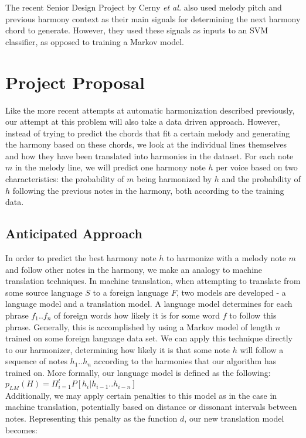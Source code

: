 \documentclass{sig-alternate}
\begin{document}
The recent Senior Design Project by Cerny \textit{et al.} \cite{UAMP} also used melody pitch and previous harmony context
as their main signals for determining the next harmony chord to generate. However, they used these
signals as inputs to an SVM classifier, as opposed to training a Markov model. 

\section{Project Proposal}
\label{sec:project_proposal}
Like the more recent attempts at automatic harmonization described previously, our attempt at this problem will also
take a data driven approach. However, instead of trying to predict the chords that fit a certain melody and generating
the harmony based on these chords, we look at the individual lines themselves and how they have been translated into
harmonies in the dataset. For each note $m$ in the melody line, we will predict one harmony note $h$ per voice
based on two characteristics: the probability of $m$ being harmonized by $h$ and the probability of $h$ following the 
previous notes in the harmony, both according to the training data.

\subsection{Anticipated Approach}
\label{subsec:approach}
In order to predict the best harmony note $h$ to harmonize with a melody note $m$ and follow other notes in the harmony,
we make an analogy to machine translation techniques. In machine translation, when attempting to translate from some source
language $S$ to a foreign language $F$, two models are developed - a language model and a translation model.
A language model determines for each phrase $f_1 .. f_n$ of foreign words how likely it is for some word $f$ to follow this phrase. 
Generally, this is accomplished by using a Markov model of length $n$ trained on some foreign language data set. We can apply 
this technique directly to our harmonizer, determining how likely it is that some note $h$ will follow a sequence of notes $h_1 .. h_n$ according to the harmonies that our algorithm has trained on. More formally, our language model is defined as the following:\\

$p_{LM}(H) = \Pi_{i = 1}^{l} P[h_{i} | h_{i - 1} .. h_{i - n}]$\\

Additionally, we may apply certain penalties to this model as in the case in machine translation, potentially based on distance or dissonant intervals between notes. Representing this penalty as the function $d$, our new translation model becomes:\\
\end{document}
